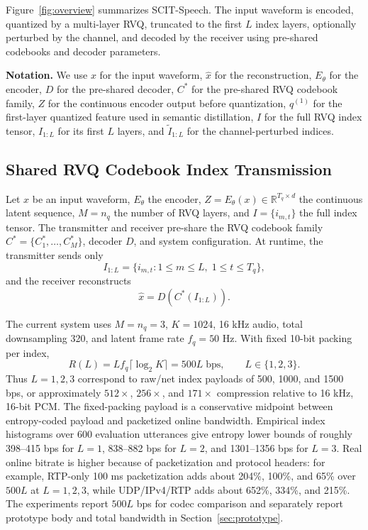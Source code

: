 ﻿\documentclass[conference]{IEEEtran}
\newcommand{\method}{SCIT-Speech}
\newcommand{\codebook}{C^\ast}
\newcommand{\rawrate}{R(L)}
\begin{document}
Figure~\ref{fig:overview} summarizes \method. The input waveform is encoded, quantized by a multi-layer RVQ, truncated to the first \(L\) index layers, optionally perturbed by the channel, and decoded by the receiver using pre-shared codebooks and decoder parameters.

\textbf{Notation.}
We use \(x\) for the input waveform, \(\hat{x}\) for the reconstruction, \(E_\theta\) for the encoder, \(D\) for the pre-shared decoder, \(\codebook\) for the pre-shared RVQ codebook family, \(Z\) for the continuous encoder output before quantization, \(q^{(1)}\) for the first-layer quantized feature used in semantic distillation, \(I\) for the full RVQ index tensor, \(I_{1:L}\) for its first \(L\) layers, and \(\tilde{I}_{1:L}\) for the channel-perturbed indices.

\subsection{Shared RVQ Codebook Index Transmission}

Let \(x\) be an input waveform, \(E_\theta\) the encoder, \(Z=E_\theta(x)\in\mathbb{R}^{T_q\times d}\) the continuous latent sequence, \(M=n_q\) the number of RVQ layers, and \(I=\{i_{m,t}\}\) the full index tensor. The transmitter and receiver pre-share the RVQ codebook family \(\codebook=\{C_1^\ast,\ldots,C_M^\ast\}\), decoder \(D\), and system configuration. At runtime, the transmitter sends only
\[
I_{1:L}=\{i_{m,t}:1\leq m\leq L,\;1\leq t\leq T_q\},
\]
and the receiver reconstructs
\[
\hat{x}=D(\codebook(I_{1:L})).
\]

The current system uses \(M=n_q=3\), \(K=1024\), 16 kHz audio, total downsampling 320, and latent frame rate \(f_q=50\) Hz. With fixed 10-bit packing per index,
\[
\rawrate = L f_q \lceil \log_2 K\rceil = 500L\;\text{bps}, \qquad L\in\{1,2,3\}.
\]
Thus \(L=1,2,3\) correspond to raw/net index payloads of 500, 1000, and 1500 bps, or approximately \(512\times\), \(256\times\), and \(171\times\) compression relative to 16 kHz, 16-bit PCM. The fixed-packing payload is a conservative midpoint between entropy-coded payload and packetized online bandwidth. Empirical index histograms over 600 evaluation utterances give entropy lower bounds of roughly 398--415 bps for \(L=1\), 838--882 bps for \(L=2\), and 1301--1356 bps for \(L=3\). Real online bitrate is higher because of packetization and protocol headers: for example, RTP-only 100 ms packetization adds about 204\%, 100\%, and 65\% over \(500L\) at \(L=1,2,3\), while UDP/IPv4/RTP adds about 652\%, 334\%, and 215\%. The experiments report \(500L\) bps for codec comparison and separately report prototype body and total bandwidth in Section~\ref{sec:prototype}.
\end{document}
